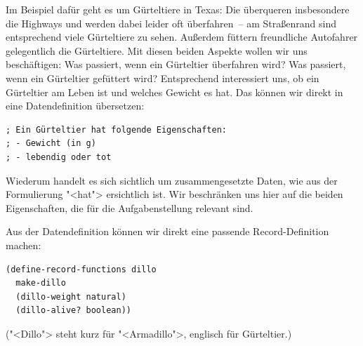 Im Beispiel dafür geht es um Gürteltiere in Texas:
Die überqueren insbesondere die Highways
und werden dabei leider oft überfahren~-- am Straßenrand
sind entsprechend viele Gürteltiere zu sehen.  Außerdem füttern
freundliche Autofahrer gelegentlich die Gürteltiere.  Mit diesen
beiden Aspekte wollen wir uns beschäftigen: Was passiert, wenn ein
Gürteltier überfahren wird?  Was passiert, wenn ein Gürteltier
gefüttert wird?  Entsprechend interessiert uns, ob ein Gürteltier am
Leben ist und welches Gewicht es hat.  Das können wir direkt in eine
Datendefinition übersetzen:
%
\begin{verbatim}
; Ein Gürteltier hat folgende Eigenschaften:
; - Gewicht (in g)
; - lebendig oder tot
\end{verbatim}
%
Wiederum handelt es sich sichtlich um zusammengesetzte Daten, wie
aus der Formulierung "<hat"> ersichtlich ist.  Wir beschränken uns
hier auf die beiden Eigenschaften, die für die Aufgabenstellung
relevant sind.

Aus der Datendefinition können wir direkt eine passende
Record-Definition machen:
% 
\begin{verbatim}
(define-record-functions dillo
  make-dillo
  (dillo-weight natural)
  (dillo-alive? boolean))
\end{verbatim}
%
("<Dillo"> steht kurz für "<Armadillo">, englisch für Gürteltier.)

